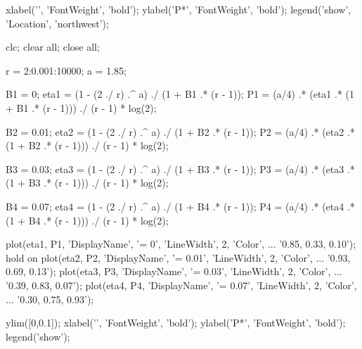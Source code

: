 \begin{verbatim*}
xlabel('\eta', 'FontWeight', 'bold');
ylabel('P*', 'FontWeight', 'bold');
legend('show', 'Location', 'northwest');

clc; clear all; close all;

r = 2:0.001:10000;
a = 1.85;

B1 = 0;
eta1 = (1 - (2 ./ r) .^ a) ./ (1 + B1 .* (r - 1));
P1 = (a/4) .* (eta1 .* (1 + B1 .* (r - 1))) ./ (r - 1) * log(2);

B2 = 0.01;
eta2 = (1 - (2 ./ r) .^ a) ./ (1 + B2 .* (r - 1));
P2 = (a/4) .* (eta2 .* (1 + B2 .* (r - 1))) ./ (r - 1) * log(2);

B3 = 0.03;
eta3 = (1 - (2 ./ r) .^ a) ./ (1 + B3 .* (r - 1));
P3 = (a/4) .* (eta3 .* (1 + B3 .* (r - 1))) ./ (r - 1) * log(2);

B4 = 0.07;
eta4 = (1 - (2 ./ r) .^ a) ./ (1 + B4 .* (r - 1));
P4 = (a/4) .* (eta4 .* (1 + B4 .* (r - 1))) ./ (r - 1) * log(2);

plot(eta1, P1, 'DisplayName', '\beta = 0', 'LineWidth', 2, 'Color', ...
    '0.85, 0.33, 0.10');
hold on
plot(eta2, P2, 'DisplayName', '\beta = 0.01', 'LineWidth', 2, 'Color', ...
    '0.93, 0.69, 0.13');
plot(eta3, P3, 'DisplayName', '\beta = 0.03', 'LineWidth', 2, 'Color', ...
    '0.39, 0.83, 0.07');
plot(eta4, P4, 'DisplayName', '\beta = 0.07', 'LineWidth', 2, 'Color', ...
    '0.30, 0.75, 0.93');

ylim([0,0.1]);
xlabel('\eta', 'FontWeight', 'bold');
ylabel('P*', 'FontWeight', 'bold');
legend('show');
\end{verbatim*}

